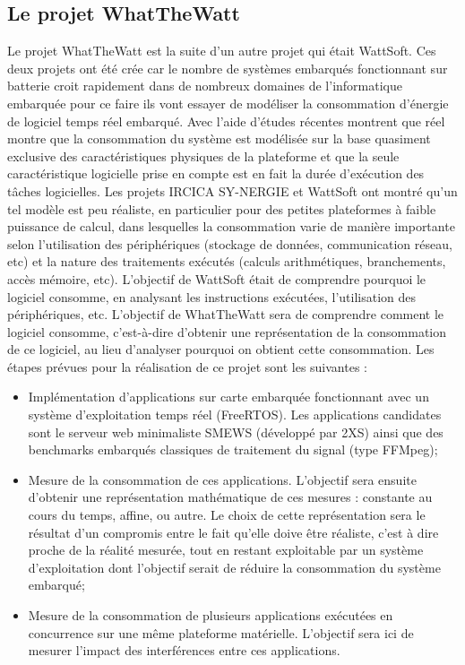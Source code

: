\documentclass[a4paper]{article}
\begin{document}
\subsection{Le projet WhatTheWatt}
Le projet WhatTheWatt est la suite d'un autre projet qui était WattSoft. Ces deux projets ont été crée car le nombre de systèmes embarqués fonctionnant sur batterie croit rapidement dans de nombreux domaines de l'informatique embarquée pour ce faire ils vont essayer de modéliser la consommation d'énergie de logiciel temps réel embarqué. Avec l'aide d'études récentes montrent que réel montre que la consommation du système est modélisée sur la base quasiment exclusive des caractéristiques physiques de la plateforme et que la seule caractéristique logicielle prise en compte est en fait la durée d’exécution des tâches logicielles. Les projets IRCICA SY-NERGIE et WattSoft ont montré qu’un tel modèle est peu réaliste, en particulier pour des petites plateformes à faible puissance de calcul, dans lesquelles la consommation varie de manière importante selon l’utilisation des périphériques (stockage de données, communication réseau, etc) et la nature des traitements exécutés (calculs arithmétiques, branchements, accès mémoire, etc). L’objectif de WattSoft était de comprendre pourquoi le logiciel consomme, en analysant les instructions exécutées, l’utilisation des périphériques, etc. L’objectif de WhatTheWatt sera de comprendre comment le logiciel consomme, c’est-à-dire d’obtenir une représentation de la consommation de ce logiciel, au lieu d’analyser pourquoi on obtient cette consommation. Les étapes prévues pour la réalisation de ce projet sont les suivantes : 

\begin{itemize}
\item Implémentation d’applications sur carte embarquée fonctionnant avec un système d’exploitation temps réel (FreeRTOS). Les applications candidates sont le serveur web minimaliste SMEWS (développé par 2XS) ainsi que des benchmarks embarqués classiques de traitement du signal (type FFMpeg);

\item Mesure de la consommation de ces applications. L’objectif sera ensuite d’obtenir une représentation mathématique de ces mesures : constante au cours du temps, affine, ou autre. Le choix de cette représentation sera le résultat d’un compromis entre le fait qu’elle doive être réaliste, c’est à dire proche de la réalité mesurée, tout en restant exploitable par un système d’exploitation dont l’objectif serait de réduire la consommation du système embarqué;

\item Mesure de la consommation de plusieurs applications exécutées en concurrence sur une même plateforme matérielle. L’objectif sera ici de mesurer l’impact des interférences entre ces applications.
\end{itemize}
\end{document}
